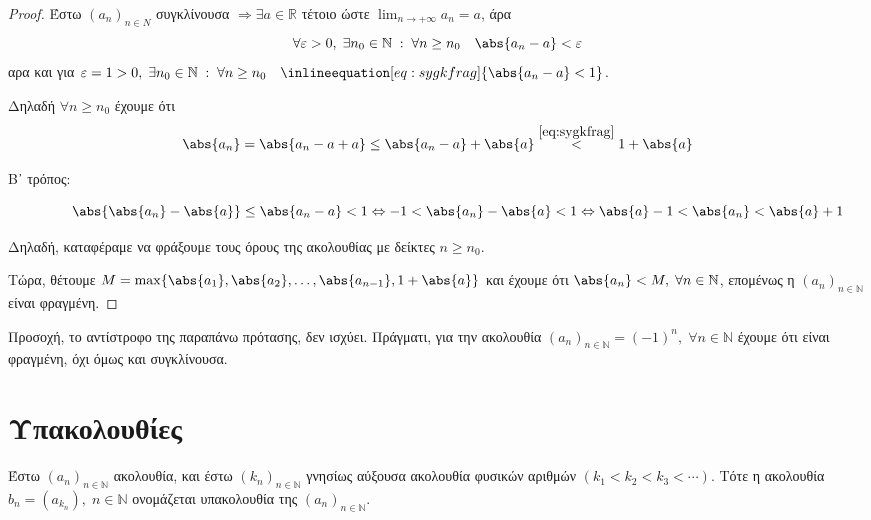 \documentclass[main.tex]{subfiles}
\begin{document}
\begin{proof}
    Έστω $ (a_{n})_{n \in \mathbb{Ν}} $ συγκλίνουσα $ \Rightarrow 
    \exists a \in \mathbb{R} $ τέτοιο ώστε $ \lim_{n \to +\infty} a_{n}
    =a $, άρα 
    \[
        \forall \varepsilon > 0, \; \exists n_{0} \in \mathbb{N} \; 
        : \; \forall n \geq n_{0}\quad \abs{a_{n}-a} < \varepsilon  
    \] 
    αρα και για $ \varepsilon =1>0, \; \exists n_{0} \in \mathbb{N} \; 
    : \; \forall n \geq n_{0} \quad 
    \inlineequation[eq:sygkfrag]{\abs{a_{n}-a} < 1} $. 

    Δηλαδή $ \forall n \geq n_{0} $ έχουμε ότι 
    \[
        \abs{a_{n}} = \abs{a_{n}-a + a} \leq \abs{a_{n} - a} + \abs{a} 
        \overset{\eqref{eq:sygkfrag}}{<} 1 + \abs{a}  
    \] 

    \begin{description}
        \item [Β᾽ τρόπος:] \[ \abs{\abs{a_{n}} - \abs{a}} \leq 
                \abs{a_{n}- a} < 1 \Leftrightarrow -1 < \abs{a_{n}} 
                - \abs{a} < 1 \Leftrightarrow \abs{a} -1 < \abs{a_{n}} 
            < \abs{a} + 1 \]
    \end{description}

    Δηλαδή, καταφέραμε να φράξουμε τους όρους της ακολουθίας με δείκτες 
    $n \geq n_{0} $.

    Τώρα, θέτουμε $ M = \max \{ \abs{a_{1}} , \abs{a_{2}} , \ldots, 
    \abs{a_{n-1}} , 1 + \abs{a}\} $ και έχουμε ότι $ \abs{a_{n}} 
    < M, \; \forall n \in \mathbb{N} $, επομένως η 
    $ (a_{n})_{n \in \mathbb{N}} $ είναι φραγμένη.
\end{proof}

\begin{rem}
    Προσοχή, το αντίστροφο της παραπάνω πρότασης, δεν ισχύει. Πράγματι, 
    για την  ακολουθία $ (a_{n})_{n \in \mathbb{N}} = (-1)^{n}, \; 
    \forall n \in \mathbb{N} $ έχουμε ότι είναι φραγμένη, όχι όμως και 
    συγκλίνουσα.
\end{rem}

\section{Υπακολουθίες}

\begin{dfn}
    Έστω $ (a_{n})_{n \in \mathbb{N}} $ ακολουθία, και έστω $ 
    (k_{n})_{n \in \mathbb{N}} $ γνησίως
    αύξουσα ακολουθία φυσικών αριθμών $ (k_{1}<k_{2}<k_{3}<\cdots) $. 
    Τότε η ακολουθία $ b_{n} = (a_{k_{n}}), \; n \in \mathbb{N} $ 
    ονομάζεται \textcolor{Col\thechapter}{υπακολουθία} της 
    $ (a_{n})_{n \in \mathbb{N}} $.
\end{dfn}
\end{document}
